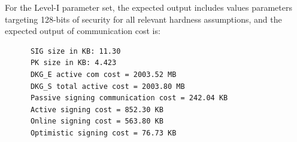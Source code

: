 \documentclass[nonacm,sigconf]{acmart}
\begin{document}
\begin{compactitem}
\begin{asparadesc}
    \item[Results:] For the Level-I parameter set, the expected output includes values parameters targeting 128-bits of security for all relevant hardness assumptions, and the expected output of communication cost is:

    \begin{verbatim}
      SIG size in KB: 11.30
      PK size in KB: 4.423
      DKG_E active com cost = 2003.52 MB
      DKG_S total active cost = 2003.80 MB
      Passive signing communication cost = 242.04 KB
      Active signing cost = 852.30 KB
      Online signing cost = 563.80 KB
      Optimistic signing cost = 76.73 KB
    \end{verbatim}
  \end{asparadesc}
\end{compactitem}







\end{document}
